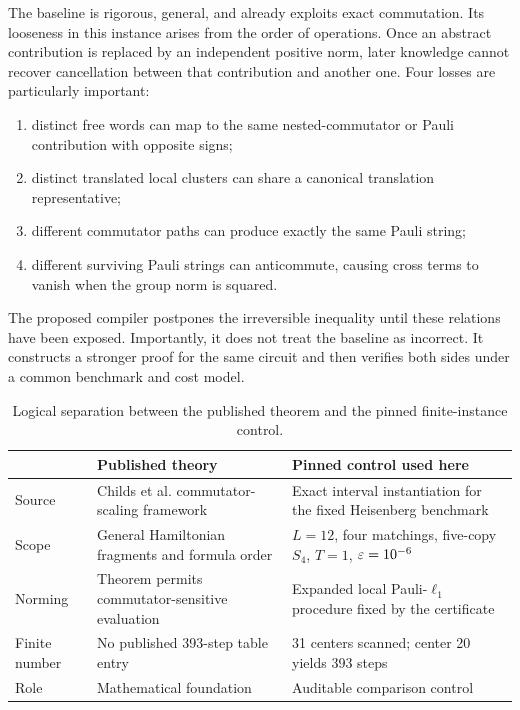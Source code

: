 The baseline is rigorous, general, and already exploits exact commutation.
Its looseness in this instance arises from the order of operations.  Once an
abstract contribution is replaced by an independent positive norm, later
knowledge cannot recover cancellation between that contribution and another
one.  Four losses are particularly important:

\begin{enumerate}
\item distinct free words can map to the same nested-commutator or Pauli
  contribution with opposite signs;
\item distinct translated local clusters can share a canonical translation
  representative;
\item different commutator paths can produce exactly the same Pauli string;
\item different surviving Pauli strings can anticommute, causing cross terms
  to vanish when the group norm is squared.
\end{enumerate}

The proposed compiler postpones the irreversible inequality until these
relations have been exposed.  Importantly, it does not treat the baseline as
incorrect.  It constructs a stronger proof for the same circuit and then
verifies both sides under a common benchmark and cost model.

\begin{table}[t]
\centering
\caption{Logical separation between the published theorem and the pinned
finite-instance control.}
\label{tab:baseline-separation}
\begin{tabularx}{\textwidth}{@{}lXX@{}}
\toprule
 & Published theory & Pinned control used here \\
\midrule
Source & Childs et al. commutator-scaling framework & Exact interval
instantiation for the fixed Heisenberg benchmark \\
Scope & General Hamiltonian fragments and formula order & $L=12$, four
matchings, five-copy $S_4$, $T=1$, $\varepsilon=10^{-6}$ \\
Norming & Theorem permits commutator-sensitive evaluation & Expanded local
Pauli-$\ell_1$ procedure fixed by the certificate \\
Finite number & No published 393-step table entry & 31 centers scanned;
center 20 yields 393 steps \\
Role & Mathematical foundation & Auditable comparison control \\
\bottomrule
\end{tabularx}
\end{table}

